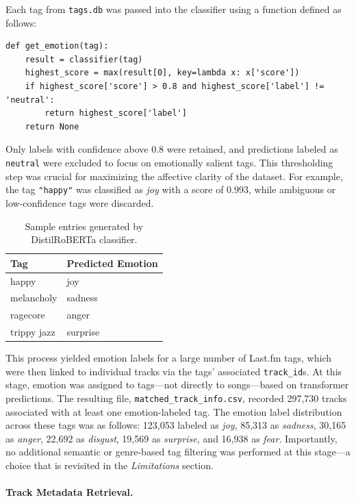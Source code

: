 \documentclass{article}
\begin{document}
Each tag from \texttt{tags.db} was passed into the classifier using a function defined as follows:

\begin{verbatim}
def get_emotion(tag):
    result = classifier(tag)
    highest_score = max(result[0], key=lambda x: x['score'])
    if highest_score['score'] > 0.8 and highest_score['label'] != 'neutral':
        return highest_score['label']
    return None
\end{verbatim}

Only labels with confidence above 0.8 were retained, and predictions labeled as \texttt{neutral} were excluded to focus on emotionally salient tags. This thresholding step was crucial for maximizing the affective clarity of the dataset. For example, the tag \texttt{"happy"} was classified as \textit{joy} with a score of 0.993, while ambiguous or low-confidence tags were discarded.

\begin{table}[H]
\centering
\begin{tabular}{|l|l|}
\hline
\textbf{Tag} & \textbf{Predicted Emotion} \\
\hline
happy & joy \\
melancholy & sadness \\
ragecore & anger \\
trippy jazz & surprise \\
\hline
\end{tabular}
\caption{Sample entries generated by DistilRoBERTa classifier.}
\end{table}

This process yielded emotion labels for a large number of Last.fm tags, which were then linked to individual tracks via the tags' associated \texttt{track\_id}s. At this stage, emotion was assigned to tags—not directly to songs—based on transformer predictions. The resulting file, \texttt{matched\_track\_info.csv}, recorded 297,730 tracks associated with at least one emotion-labeled tag. The emotion label distribution across these tags was as follows: 123,053 labeled as \textit{joy}, 85,313 as \textit{sadness}, 30,165 as \textit{anger}, 22,692 as \textit{disgust}, 19,569 as \textit{surprise}, and 16,938 as \textit{fear}. Importantly, no additional semantic or genre-based tag filtering was performed at this stage—a choice that is revisited in the \textit{Limitations} section.

\paragraph{Track Metadata Retrieval.}
\end{document}
